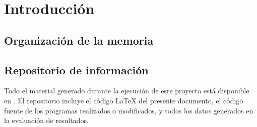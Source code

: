 \chapter{Introducción} 
\label{ch:introduccion}


\section{Organización de la memoria}
\label{sec:organizacion_memoria}

\section{Repositorio de información}
\label{sec:repositorio}
Todo el material generado durante la ejecución de este proyecto está disponible en \thegitrepo{}. El repositorio incluye el código \LaTeX{} del presente documento, el código fuente de los programas realizados o modificados, y todos los datos generados en la evaluación de resultados.








